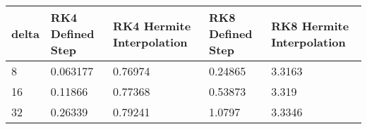 \begin{tabular}{lllll}
delta & RK4 Defined Step & RK4 Hermite Interpolation & RK8 Defined Step & RK8 Hermite Interpolation \\ 
\hline 
8 & 0.063177 & 0.76974 & 0.24865 & 3.3163 \\ 
16 & 0.11866 & 0.77368 & 0.53873 & 3.319 \\ 
32 & 0.26339 & 0.79241 & 1.0797 & 3.3346 \\ 
\hline 
\end{tabular}